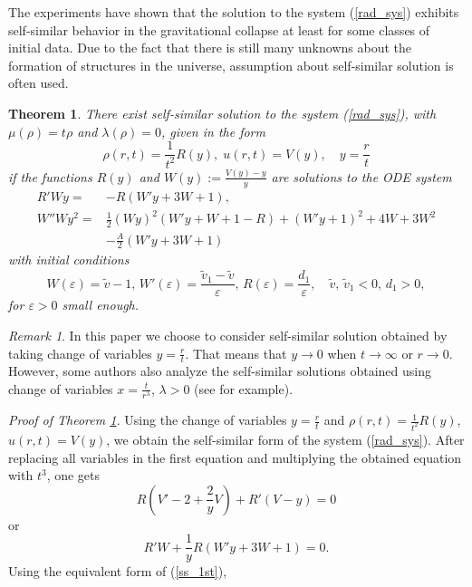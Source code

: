 \documentclass[reqno]{article}%
\theoremstyle{plain}
\newtheorem{theorem}{Theorem}[section]
\theoremstyle{definition}
\theoremstyle{remark}
\newtheorem{remark}{Remark}[section]
\numberwithin{equation}{section}
\begin{document}
The experiments have shown that  the solution to the system (\ref{rad_sys}) exhibits self-similar behavior in the gravitational collapse at least for some classes of initial data. Due to the fact that there is still many unknowns about the formation of structures in the universe, assumption about self-similar solution is often used. 


\begin{theorem}\label{thm:ss}
There exist self-similar solution to the system (\ref{rad_sys}), with $\mu(\rho)=t\rho$ and $\lambda(\rho)=0$, given in the form
\[\rho(r,t)=\frac{1}{t^2}R(y),\; u(r,t)=V(y), \quad y=\frac{r}{t}\]
 if the functions $R(y)$ and  $W(y):=\frac{V(y)-y}{y}$ are solutions to the ODE system
\begin{equation}\label{ode}
\begin{split}
R'Wy =&-R(W'y+3W+1),\\
W''Wy^2 =&\frac{1}{2}(Wy)^2(W'y+W+1-R)+(W'y+1)^2+4W+3W^2\\
& -\frac{A}{2}(W'y+3W+1)
\end{split}
\end{equation}
with initial conditions  
\begin{equation}\label{ode_id}
W(\varepsilon)=\tilde{v}-1,\, W'(\varepsilon)=\frac{\tilde{v}_1-\tilde{v}}{\varepsilon},\, R(\varepsilon)=\frac{d_1}{\varepsilon}, \quad  \tilde{v},\,\tilde{v}_1<0,\, d_1>0, 
\end{equation}
for $\varepsilon>0$ small enough.
\end{theorem}
\begin{remark}
In this paper we choose to consider self-similar solution obtained by taking change of variables $y=\frac{r}{t}$. That means that $y\to 0$ when $t\to \infty$ or $r\to 0$. However, some authors also analyze the self-similar solutions obtained using change of variables  $x=\frac{t}{r^\lambda}$, $\lambda>0$ (see \cite{sim} for example).
\end{remark}
\noindent
{\it Proof of Theorem \ref{thm:ss}.}
Using the change of variables $y=\frac{r}{t}$ and $\rho(r,t)=\frac{1}{t^2}R(y)$, $u(r,t)=V(y)$, we obtain the self-similar form of the system (\ref{rad_sys}). After replacing all variables in the first equation and multiplying the obtained equation with $t^3$, one gets
\[R(V'-2+\frac{2}{y}V)+R'(V-y)=0\]
or
\begin{equation}\label{ss_1st}
R'W+\frac{1}{y}R(W'y+3W+1)=0.
\end{equation}
Using the equivalent form of (\ref{ss_1st}),
\end{document}
